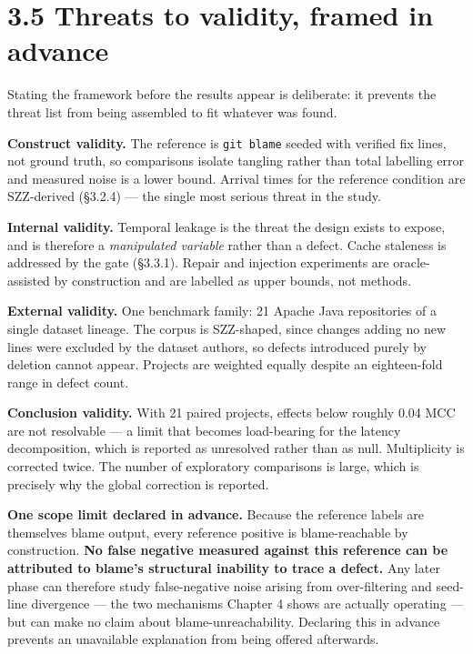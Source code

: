 \section{3.5 Threats to validity, framed in
advance}\label{threats-to-validity-framed-in-advance}

Stating the framework before the results appear is deliberate: it
prevents the threat list from being assembled to fit whatever was found.

\textbf{Construct validity.} The reference is \texttt{git\ blame} seeded
with verified fix lines, not ground truth, so comparisons isolate
tangling rather than total labelling error and measured noise is a lower
bound. Arrival times for the reference condition are SZZ-derived
(\S{}3.2.4) --- the single most serious threat in the study.

\textbf{Internal validity.} Temporal leakage is the threat the design
exists to expose, and is therefore a \emph{manipulated variable} rather
than a defect. Cache staleness is addressed by the gate (\S{}3.3.1). Repair
and injection experiments are oracle-assisted by construction and are
labelled as upper bounds, not methods.

\textbf{External validity.} One benchmark family: 21 Apache Java
repositories of a single dataset lineage. The corpus is SZZ-shaped,
since changes adding no new lines were excluded by the dataset authors,
so defects introduced purely by deletion cannot appear. Projects are
weighted equally despite an eighteen-fold range in defect count.

\textbf{Conclusion validity.} With 21 paired projects, effects below
roughly 0.04 MCC are not resolvable --- a limit that becomes
load-bearing for the latency decomposition, which is reported as
unresolved rather than as null. Multiplicity is corrected twice. The
number of exploratory comparisons is large, which is precisely why the
global correction is reported.

\textbf{One scope limit declared in advance.} Because the reference
labels are themselves blame output, every reference positive is
blame-reachable by construction. \textbf{No false negative measured
against this reference can be attributed to blame's structural inability
to trace a defect.} Any later phase can therefore study false-negative
noise arising from over-filtering and seed-line divergence --- the two
mechanisms Chapter 4 shows are actually operating --- but can make no
claim about blame-unreachability. Declaring this in advance prevents an
unavailable explanation from being offered afterwards.

